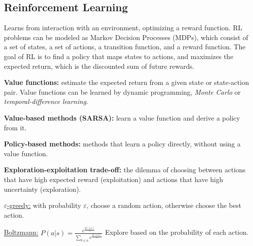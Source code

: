 \subsection*{Reinforcement Learning}
Learns from interaction with an environment, optimizing a reward function.
RL problems can be modeled as Markov Decision Processes (MDPs), which consist of a set
of states, a set of actions, a transition function, and a reward function. The goal
of RL is to find a policy that maps states to actions, and maximizes the expected return,
which is the discounted sum of future rewards.

\textbf{Value functions:} estimate the expected return from a given state or
state-action pair. Value functions can be learned by dynamic programming,
\textit{Monte Carlo} or \textit{temporal-difference learning}.

\textbf{Value-based methods (SARSA):} learn a value function and derive a policy from it.

\textbf{Policy-based methods:} methods that learn a policy directly, without using a value function.

\textbf{Exploration-exploitation trade-off:} the dilemma of choosing between actions
that have high expected reward (exploitation) and actions that have high
uncertainty (exploration).

\underline{$\varepsilon$-greedy:} with probability $\varepsilon$, choose a random action, otherwise choose the best action.

\underline{Boltzmann:} $P(a|s)=\frac{e^{\frac{Q(s, a)}{\tau}}}{\sum_{b\in a}e^{\frac{Q(s, b)}{\tau}}}$
Explore based on the probability of each action.

